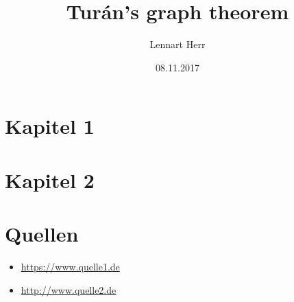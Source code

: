 \documentclass[linedtoc,shortdoc,colorback,accentcolor=tud1a,smallchapter,leqno,12pt]{tudreport}
\title{Turán's graph theorem}
\author{Lennart Herr}
\date{08.11.2017}
\begin{document}
\maketitle
\tableofcontents
\newpage
{\let\clearpage\relax \chapter{Kapitel 1}}

\chapter{Kapitel 2}

{\let\clearpage\relax \chapter{Quellen}}

\begin{itemize}
\item \url{https://www.quelle1.de}
\item \url{http://www.quelle2.de}
\end{itemize}
\end{document}
